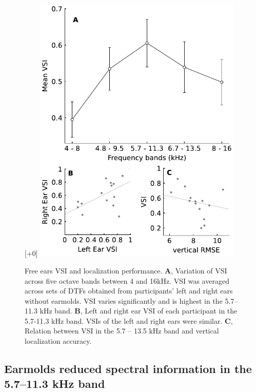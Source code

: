\begin{figure}
\captionsetup{width=10cm}
\centering
    \raisebox{0pt}[\dimexpr\height+0\baselineskip\relax]{
        \includegraphics[width=10cm]{../Results/figures/fig2/fig2}}
	\caption{Free ears VSI and localization performance. \textbf{A}, Variation of VSI across five octave bands between 4 and 16kHz. VSI was averaged across sets of DTFs obtained from participants' left and right ears without earmolds. VSI varies significantly and is highest in the 5.7–11.3 kHz band.  \textbf{B}, Left and right ear VSI of each participant in the 5.7-11.3 kHz band. VSIs of the left and right ears were similar. \textbf{C}, Relation between VSI in the 5.7 – 13.5 kHz band and vertical localization accuracy.}
	\label{fig:ef_vsi}
\end{figure}
\noindent\vspace{-1\baselineskip}

\subsection{Earmolds reduced spectral information in the 5.7–11.3 kHz band}

